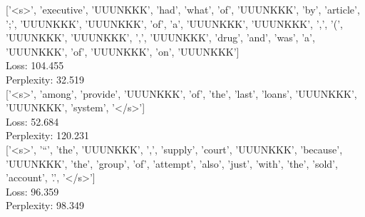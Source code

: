 \documentclass{article}
\begin{document}
['\textless s\textgreater', 'executive', 'UUUNKKK', 'had', 'what', 'of', 'UUUNKKK', 'by', 'article', ';', 'UUUNKKK', 'UUUNKKK', 'of', 'a', 'UUUNKKK', 'UUUNKKK', ',', '(', 'UUUNKKK', 'UUUNKKK', ',', 'UUUNKKK', 'drug', 'and', 'was', 'a', 'UUUNKKK', 'of', 'UUUNKKK', 'on', 'UUUNKKK']\\
Loss: 104.455\\
Perplexity: 32.519\\


​['\textless s\textgreater', 'among', 'provide', 'UUUNKKK', 'of', 'the', 'last', 'loans', 'UUUNKKK', 'UUUNKKK', 'system', '\textless /s\textgreater']\\
Loss: 52.684\\
Perplexity: 120.231​\\


['\textless s\textgreater', '``', 'the', 'UUUNKKK', ',', 'supply', 'court', 'UUUNKKK', 'because', 'UUUNKKK', 'the', 'group', 'of', 'attempt', 'also', 'just', 'with', 'the', 'sold', 'account', '.', '\textless /s\textgreater']\\
Loss: 96.359\\
Perplexity: 98.349
\end{document}
